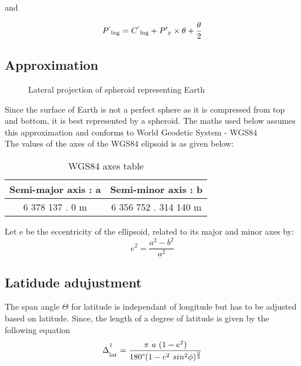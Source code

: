 \documentclass[conference]{IEEEtran}
\begin{document}
and

\begin{equation}P\textsuperscript{`}\textsubscript{lng} = C\textsuperscript{`}\textsubscript{lng} + P'\textsubscript{y} \times \theta + \frac{\theta}{2}\end{equation}

\subsection{Approximation}
\begin{figure}[htbp]
\centerline{}
\caption{Lateral projection of spheroid representing Earth}
\label{Spheroid}
\end{figure}
Since the surface of Earth is not a perfect sphere as it is compressed from top and bottom, it is best represented by a spheroid.
The maths used below assumes this approximation and conforms to World Geodetic System - WGS84\cite{b1}\\
The values of the axes of the WGS84 elipsoid is as given below:
\begin{table}[h!]
\caption{WGS84 axes table}
\begin{center}
\bgroup
\def\arraystretch{1.4}%
\begin{tabular}{c|c}
\textbf{Semi-major axis : a} & \textbf{Semi-minor axis : b} \\
\hline
6 378 137 . 0 m & 6 356 752 . 314 140 m\\
\end{tabular}
\egroup
\end{center} \end{table}

Let e be the eccentricity of the ellipsoid, related to its major and minor axes by:
\begin{equation}e^2 =  \frac{a^2-b^2}{a^2}\end{equation}

\subsection{Latidude adujustment}
The span angle $\Theta$ for latitude is independant of longitude but has to be adjusted based on latitude.
Since, the length of a degree of latitude is given by the following equation\cite{b2}
\begin{equation}\Delta^\textsuperscript{1}_\textsubscript{lat}=\frac{\pi \ a \ (1 - e^2)} {180\degree (1 - e\textsuperscript{2} \ sin\textsuperscript{2}\phi)^\frac{3}{2}}\end{equation}
\end{document}
